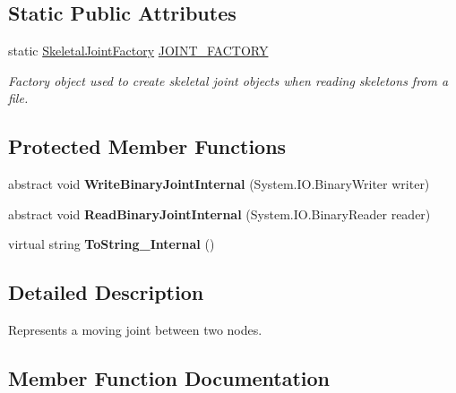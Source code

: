 \subsection*{Static Public Attributes}
\begin{DoxyCompactItemize}
\item 
static \hyperlink{class_skeletal_joint___base_aac5116bb70fb19058943811a19951848}{Skeletal\+Joint\+Factory} \hyperlink{class_skeletal_joint___base_a590ba897b9331ad634a26101e27d18ed}{J\+O\+I\+N\+T\+\_\+\+F\+A\+C\+T\+O\+RY}
\begin{DoxyCompactList}\small\item\em Factory object used to create skeletal joint objects when reading skeletons from a file. \end{DoxyCompactList}\end{DoxyCompactItemize}
\subsection*{Protected Member Functions}
\begin{DoxyCompactItemize}
\item 
\mbox{\label{class_skeletal_joint___base_a2d98672b13221f6a7f95f24c121c6b10}} 
abstract void {\bfseries Write\+Binary\+Joint\+Internal} (System.\+I\+O.\+Binary\+Writer writer)
\item 
\mbox{\label{class_skeletal_joint___base_aebacae4579db784149dcb6123820a4fb}} 
abstract void {\bfseries Read\+Binary\+Joint\+Internal} (System.\+I\+O.\+Binary\+Reader reader)
\item 
\mbox{\label{class_skeletal_joint___base_a3617349ae11146f48876525ed601c33e}} 
virtual string {\bfseries To\+String\+\_\+\+Internal} ()
\end{DoxyCompactItemize}


\subsection{Detailed Description}
Represents a moving joint between two nodes. 



\subsection{Member Function Documentation}
\mbox{\label{class_skeletal_joint___base_abf96267052733ccf001e0b092c6582f8}} 
